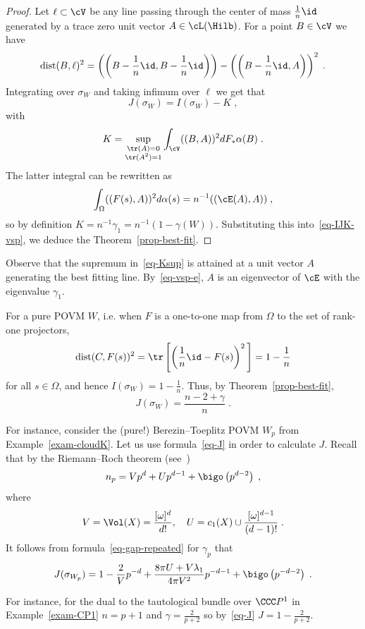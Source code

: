 \begin{proof}
Let $\ell \subset \cV$ be any line passing through the center of mass $\frac{1}{n}\id$
generated by a trace zero unit vector $A \in \cL(\Hilb)$. For a point $B \in \cV$ we have
\[
\text{dist}(B,\ell)^2= \left(\left(B-\frac{1}{n}\id,B-\frac{1}{n}\id\right)\right)- \left(\left(B-\frac{1}{n}\id,A\right)\right)^2\;.
\]
Integrating over $\sigma_W$ and taking infimum over $\ell$ we get that
\begin{equation}\label{eq-IJK-vsp}
J(\sigma_W) = I(\sigma_W) - K\;,
\end{equation}
with
\begin{equation}\label{eq-Ksup}
K= \sup_{\substack{\tr(A)=0 \\ \tr(A^2)=1}} \int_\cV ((B,A))^2 dF_*\alpha(B)\;.
\end{equation}
The latter integral can be rewritten as
\begin{equation}\label{eq-vsp-e}
\int_\Omega ((F(s),A))^2 d\alpha(s) = n^{-1}((\cE(A), A))\;,
\end{equation}
so by definition $K = n^{-1}\gamma_1= n^{-1}(1-\gamma(W))$. Substituting this into~\eqref{eq-IJK-vsp}, we deduce the Theorem~\ref{prop-best-fit}.
\end{proof}

\begin{rema}\label{rem-eigenv}
Observe that the supremum in~\eqref{eq-Ksup} is attained at a unit vector $A$
generating the best fitting line. By~\eqref{eq-vsp-e}, $A$ is an eigenvector of $\cE$ with the eigenvalue $\gamma_1$.
\end{rema}

\begin{exam}
For a pure POVM $W$, i.e. when $F$ is a one-to-one map from $\Omega$ to the set of rank-one projectors,
\[
\text{dist}(C,F(s))^2
= \tr\left[\left(\frac{1}{n}\id -F(s)\right)^2\,\right]
= 1-\frac{1}{n}
\]
for all $s \in \Omega$, and hence $I(\sigma_W)= 1-\frac{1}{n}$. Thus, by Theorem~\ref{prop-best-fit},
\begin{equation}\label{eq-J}
J(\sigma_W)= \frac{n-2+\gamma}{n}\;.
\end{equation}

For instance, consider the (pure!) Berezin--Toeplitz POVM $W_p$ from Example~\ref{exam-cloudK}. Let us use formula~\eqref{eq-J} in order to calculate $J$. Recall that by the Riemann--Roch theorem (see~\cite[Propositions~2.25 and 4.21]{Fine-lectures})
\[
n_p = Vp^d + Up^{d-1}+ \bigo\left(p^{d-2}\right)\;,
\]
where
\[
V= \Vol(X) = \frac{[\omega]^d}{d!},\quad U = c_1(X) \cup \frac{[\omega]^{d-1}}{(d-1)!}\;.
\]
It follows from formula~\eqref{eq-gap-repeated} for $\gamma_p$ that
\[
J(\sigma_{W_p})= 1 -\frac{2}{V}p^{-d} + \frac{8\pi U+ V\lambda_1}{4\pi V^2} p^{-d-1} +\bigo\left(p^{-d-2}\right)\;.
\]

For instance, for the dual to the tautological bundle over $\CCC P^1$ in Example~\ref{exam-CP1} $n=p+1$ and $\gamma= \frac{2}{p+2}$ so by~\eqref{eq-J} $J = 1- \frac{2}{p+2}$.
\end{exam}


